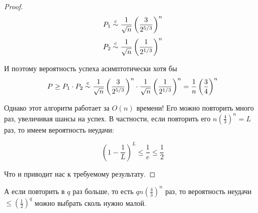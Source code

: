 \begin{proof}
$$ P_1 \overset{\text{c}}{\sim} \frac{1}{\sqrt n}\left(\frac{3}{2^{5/3}}\right)^n$$
$$ P_2 \overset{\text{c}}{\sim} \frac{1}{\sqrt n}\left(\frac{1}{2^{1/3}}\right)^n$$

И поэтому вероятность успеха асимптотически хотя бы
$$P \geq P_1 \cdot P_2 \overset{\text{c}}{\sim} \frac{1}{\sqrt n}\left(\frac{3}{2^{5/3}}\right)^n \cdot \frac{1}{\sqrt n}\left(\frac{1}{2^{1/3}}\right)^n = \frac{1}{n}\left(\frac{3}{4}\right)^n$$

Однако этот алгоритм работает за $O(n)$ времени! Его можно повторить много раз, увеличивая шансы на успех. В частности, если повторить его $n\left(\frac{4}{3}\right)^n = L$ раз, то имеем вероятность неудачи:

$$\left(1-\frac{1}{L}\right)^L \leq \frac{1}{e} \leq \frac{1}{2}$$

Что и приводит нас к требуемому результату.
\end{proof}

\begin{nb*}А если повторить в $q$ раз больше, то есть $qn\left(\frac{4}{3}\right)^n$ раз, то вероятность неудачи $\leq\left(\frac{1}{2}\right)^q$ можно выбрать сколь нужно малой.
\end{nb*}
